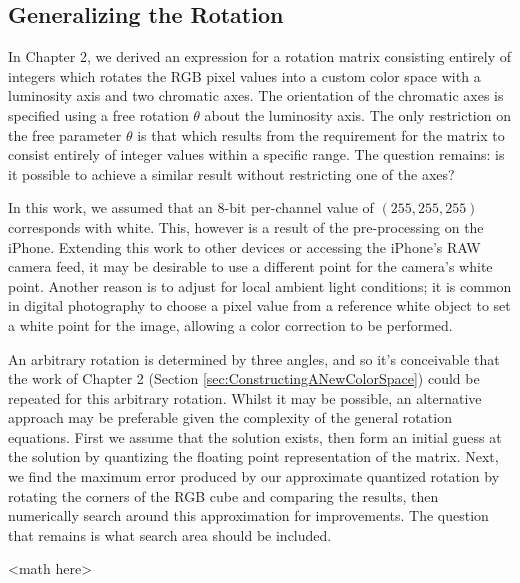 \subsection{Generalizing the Rotation}\label{sec:GeneralizingTheRotation}
In Chapter 2, we derived an expression for a rotation matrix consisting entirely of integers which rotates the RGB pixel values into a custom color space with a luminosity axis and two chromatic axes. The orientation of the chromatic axes is specified using a free rotation $\theta$ about the luminosity axis. The only restriction on the free parameter $\theta$ is that which results from the requirement for the matrix to consist entirely of integer values within a specific range. The question remains: is it possible to achieve a similar result without restricting one of the axes?

In this work, we assumed that an 8-bit per-channel value of $(255, 255, 255)$ corresponds with white. This, however is a result of the pre-processing on the iPhone. Extending this work to other devices or accessing the iPhone's RAW camera feed, it may be desirable to use a different point for the camera's white point. Another reason is to adjust for local ambient light conditions; it is common in digital photography to choose a pixel value from a reference white object to set a white point for the image, allowing a color correction to be performed.

An arbitrary rotation is determined by three angles, and so it's conceivable that the work of Chapter 2 (Section \ref{sec:ConstructingANewColorSpace}) could be repeated for this arbitrary rotation. Whilst it may be possible, an alternative approach may be preferable given the complexity of the general rotation equations. First we assume that the solution exists, then form an initial guess at the solution by quantizing the floating point representation of the matrix. Next, we find the maximum error produced by our approximate quantized rotation by rotating the corners of the RGB cube and comparing the results, then numerically search around this approximation for improvements. The question that remains is what search area should be included.

<math here>

